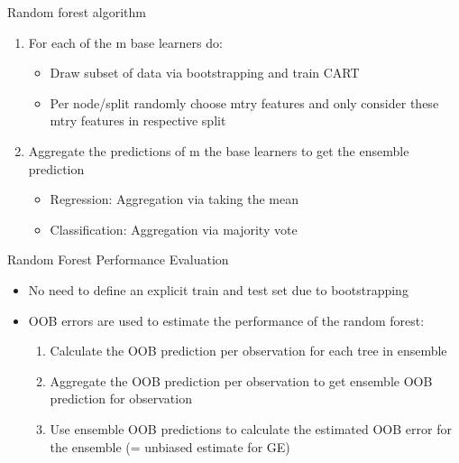 \begin{vbframe}{Random forest algorithm }
\begin{enumerate}
  \item For each of the m base learners do:
  \begin{itemize}
    \item Draw subset of data via bootstrapping and train CART 
    \item Per node/split randomly choose mtry features and only consider these mtry features in respective split
  \end{itemize}
  \item Aggregate the predictions of m the base learners to get the ensemble prediction
  \begin{itemize}
    \item Regression: Aggregation via taking the mean
    \item Classification: Aggregation via majority vote
  \end{itemize}
\end{enumerate}
\end{vbframe}

\begin{vbframe}{Random Forest Performance Evaluation}
\begin{itemize}
  \item No need to define an explicit train and test set due to bootstrapping 
  \item OOB errors are used to estimate the performance of the random forest: 
  \begin{enumerate}
    \item Calculate the OOB prediction per observation for each tree in ensemble 
    \item Aggregate the OOB prediction per observation to get ensemble OOB prediction for observation
    \item Use ensemble OOB predictions to calculate the estimated OOB error for the ensemble (= unbiased estimate for GE) 
  \end{enumerate}
\end{itemize}
\end{vbframe}


